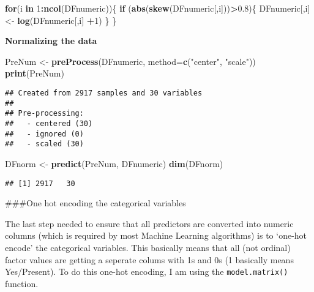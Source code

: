 \documentclass[]{article}
\newenvironment{Shaded}{\begin{snugshade}}{\end{snugshade}}
\newcommand{\ControlFlowTok}[1]{\textcolor[rgb]{0.13,0.29,0.53}{\textbf{#1}}}
\newcommand{\DataTypeTok}[1]{\textcolor[rgb]{0.13,0.29,0.53}{#1}}
\newcommand{\DecValTok}[1]{\textcolor[rgb]{0.00,0.00,0.81}{#1}}
\newcommand{\FloatTok}[1]{\textcolor[rgb]{0.00,0.00,0.81}{#1}}
\newcommand{\KeywordTok}[1]{\textcolor[rgb]{0.13,0.29,0.53}{\textbf{#1}}}
\newcommand{\NormalTok}[1]{#1}
\newcommand{\OperatorTok}[1]{\textcolor[rgb]{0.81,0.36,0.00}{\textbf{#1}}}
\newcommand{\StringTok}[1]{\textcolor[rgb]{0.31,0.60,0.02}{#1}}
\begin{document}
\begin{Shaded}
\begin{Highlighting}[]
\ControlFlowTok{for}\NormalTok{(i }\ControlFlowTok{in} \DecValTok{1}\OperatorTok{:}\KeywordTok{ncol}\NormalTok{(DFnumeric))\{}
        \ControlFlowTok{if}\NormalTok{ (}\KeywordTok{abs}\NormalTok{(}\KeywordTok{skew}\NormalTok{(DFnumeric[,i]))}\OperatorTok{>}\FloatTok{0.8}\NormalTok{)\{}
\NormalTok{                DFnumeric[,i] <-}\StringTok{ }\KeywordTok{log}\NormalTok{(DFnumeric[,i] }\OperatorTok{+}\DecValTok{1}\NormalTok{)}
\NormalTok{        \}}
\NormalTok{\}}
\end{Highlighting}
\end{Shaded}

\textbf{Normalizing the data}

\begin{Shaded}
\begin{Highlighting}[]
\NormalTok{PreNum <-}\StringTok{ }\KeywordTok{preProcess}\NormalTok{(DFnumeric, }\DataTypeTok{method=}\KeywordTok{c}\NormalTok{(}\StringTok{"center"}\NormalTok{, }\StringTok{"scale"}\NormalTok{))}
\KeywordTok{print}\NormalTok{(PreNum)}
\end{Highlighting}
\end{Shaded}

\begin{verbatim}
## Created from 2917 samples and 30 variables
## 
## Pre-processing:
##   - centered (30)
##   - ignored (0)
##   - scaled (30)
\end{verbatim}

\begin{Shaded}
\begin{Highlighting}[]
\NormalTok{DFnorm <-}\StringTok{ }\KeywordTok{predict}\NormalTok{(PreNum, DFnumeric)}
\KeywordTok{dim}\NormalTok{(DFnorm)}
\end{Highlighting}
\end{Shaded}

\begin{verbatim}
## [1] 2917   30
\end{verbatim}

\#\#\#One hot encoding the categorical variables

The last step needed to ensure that all predictors are converted into
numeric columns (which is required by most Machine Learning algorithms)
is to `one-hot encode' the categorical variables. This basically means
that all (not ordinal) factor values are getting a seperate colums with
1s and 0s (1 basically means Yes/Present). To do this one-hot encoding,
I am using the \texttt{model.matrix()} function.
\end{document}
